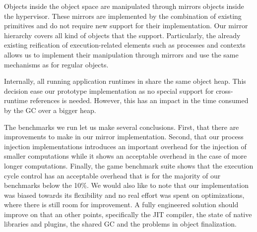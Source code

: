 Objects inside the object space are manipulated through mirrors objects inside the hypervisor. These mirrors are implemented by the combination of existing \VM primitives and do not require new \VM support for their implementation. Our mirror hierarchy covers all kind of objects that the \VM support. Particularly, the already existing reification of execution-related elements such as processes and contexts allows us to implement their manipulation through mirrors and use the same mechanisms as for regular objects.

Internally, all running application runtimes in \Vtt share the same object heap. This decision ease our prototype implementation as no special support for cross-runtime references is needed. However, this has an impact in the time consumed by the GC over a bigger heap.

The benchmarks we run let us make several conclusions. First, that there are improvements to make in our mirror implementation. Second, that our process injection implementations introduces an important overhead for the injection of smaller computations while it shows an acceptable overhead in the case of more longer computations. Finally, the game benchmark suite shows that the execution cycle control has an acceptable overhead that is for the majority of our benchmarks below the 10\%. We would also like to note that our implementation was biased towards its flexibility and no real effort was spent on optimizations, where there is still room for improvement. A fully engineered solution should improve on that an other points, specifically the JIT compiler, the state of native libraries and plugins, the shared GC and the problems in object finalization.

